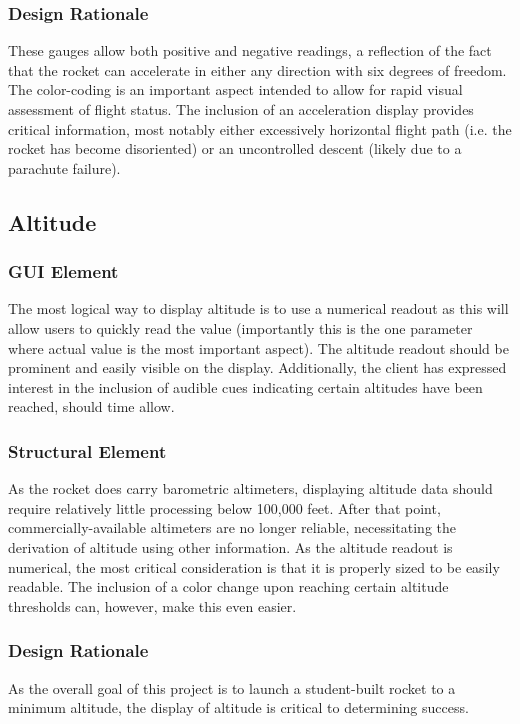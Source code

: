 \documentclass[journal,10pt,onecolumn,compsoc]{IEEEtran}
\begin{document}
		\subsubsection{Design Rationale}
			These gauges allow both positive and negative readings, a reflection of the fact that the rocket can accelerate in either any direction with six degrees of freedom.
			The color-coding is an important aspect intended to allow for rapid visual assessment of flight status.
			The inclusion of an acceleration display provides critical information, most notably either excessively horizontal flight path (i.e. the rocket has become disoriented) or an uncontrolled descent (likely due to a parachute failure).

	\subsection{Altitude}

		\subsubsection{GUI Element}
			The most logical way to display altitude is to use a numerical readout as this will allow users to quickly read the value (importantly this is the one parameter where actual value is the most important aspect).
			The altitude readout should be prominent and easily visible on the display.
			Additionally, the client has expressed interest in the inclusion of audible cues indicating certain altitudes have been reached, should time allow.

		\subsubsection{Structural Element}
			As the rocket does carry barometric altimeters, displaying altitude data should require relatively little processing below 100,000 feet.
			After that point, commercially-available altimeters are no longer reliable, necessitating the derivation of altitude using other information.
			As the altitude readout is numerical, the most critical consideration is that it is properly sized to be easily readable.
			The inclusion of a color change upon reaching certain altitude thresholds can, however, make this even easier.
			
		\subsubsection{Design Rationale}
			As the overall goal of this project is to launch a student-built rocket to a minimum altitude, the display of altitude is critical to determining success.
\end{document}
